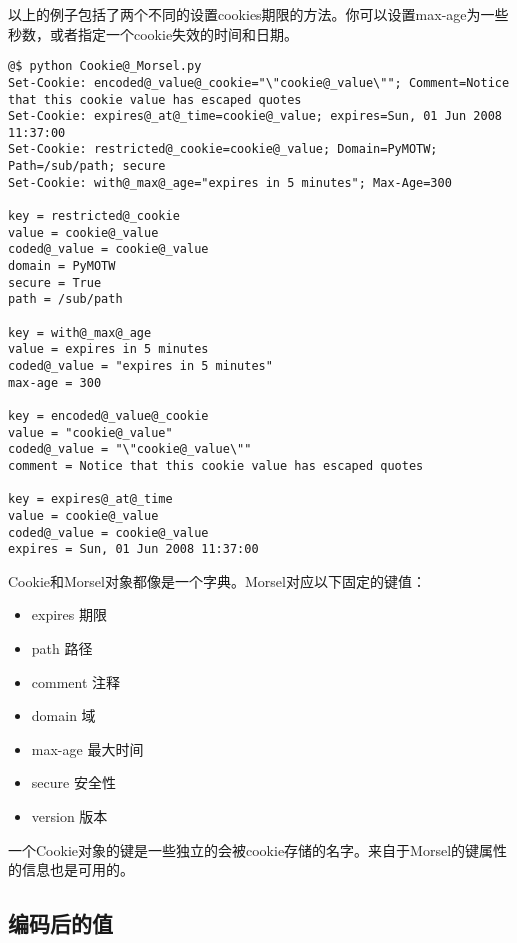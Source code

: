 \documentclass[a4paper,10pt,english]{manual}
\begin{document}
以上的例子包括了两个不同的设置cookies期限的方法。你可以设置max-age为一些秒数，或者指定一个cookie失效的时间和日期。

\begin{Verbatim}[commandchars=@\[\]]
@$ python Cookie@_Morsel.py
Set-Cookie: encoded@_value@_cookie="\"cookie@_value\""; Comment=Notice that this cookie value has escaped quotes
Set-Cookie: expires@_at@_time=cookie@_value; expires=Sun, 01 Jun 2008 11:37:00
Set-Cookie: restricted@_cookie=cookie@_value; Domain=PyMOTW; Path=/sub/path; secure
Set-Cookie: with@_max@_age="expires in 5 minutes"; Max-Age=300

key = restricted@_cookie
value = cookie@_value
coded@_value = cookie@_value
domain = PyMOTW
secure = True
path = /sub/path

key = with@_max@_age
value = expires in 5 minutes
coded@_value = "expires in 5 minutes"
max-age = 300

key = encoded@_value@_cookie
value = "cookie@_value"
coded@_value = "\"cookie@_value\""
comment = Notice that this cookie value has escaped quotes

key = expires@_at@_time
value = cookie@_value
coded@_value = cookie@_value
expires = Sun, 01 Jun 2008 11:37:00
\end{Verbatim}

Cookie和Morsel对象都像是一个字典。Morsel对应以下固定的键值：
\begin{itemize}
\item {} 
expires 期限

\item {} 
path 路径

\item {} 
comment 注释

\item {} 
domain 域

\item {} 
max-age 最大时间

\item {} 
secure 安全性

\item {} 
version 版本

\end{itemize}

一个Cookie对象的键是一些独立的会被cookie存储的名字。来自于Morsel的键属性的信息也是可用的。


\subsection{编码后的值}
\end{document}
